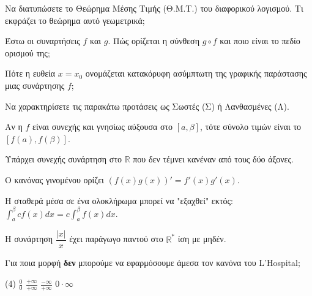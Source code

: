 \documentclass[11pt,a4paper]{article}
\newcommand{\kerkissans}[1]{{\fontfamily{maksf}\selectfont \textbf{#1}}}
\renewcommand{\textdexiakeraia}{}
\newcommand{\dint}{\displaystyle\int}
\newcommand\themanum{A}
\newcounter{thema}[section]
\renewcommand{\thethema}{\arabic{thema}}
\newcommand{\Thema}{\refstepcounter{thema}{\textbf{\textcolor{black}{\faPenSquare\ \  \large \kerkissans{\textbf{\thethemaο\hspace{2mm}Διαγώνισμα - Θέμα \themanum}}}}}\hspace{0mm}}{}
\newenvironment{thema}[1]
{\begin{tcolorbox}[title=\Thema\kerkissans{\textbf{\large{  #1}}},breakable,
enhanced standard,titlerule=0pt,toprule=0pt, rightrule=0pt, bottomrule=0pt,
colback=white,left=0mm,top=1mm,bottom=0mm,
boxrule=0pt,
colframe=white,leftrule=0mm,sharp corners,coltitle=black]
\renewcommand{\themanum}{#1}}
{\end{tcolorbox}}
\begin{document}
\begin{thema}{A}
\begin{erwthma}
    \item Να διατυπώσετε το Θεώρημα Μέσης Τιμής (Θ.Μ.Τ.) του διαφορικού λογισμού. Τι εκφράζει το θεώρημα αυτό γεωμετρικά;
    \item Έστω οι συναρτήσεις $f$ και $g$. Πώς ορίζεται η σύνθεση $g \circ f$ και ποιο είναι το πεδίο ορισμού της;
    \item Πότε η ευθεία $x=x_0$ ονομάζεται κατακόρυφη ασύμπτωτη της γραφικής παράστασης μιας συνάρτησης $f$;
    \item Να χαρακτηρίσετε τις παρακάτω προτάσεις ως Σωστές (Σ) ή Λανθασμένες (Λ).
    \begin{alist}
        \item Αν η $f$ είναι συνεχής και γνησίως αύξουσα στο $[a, \beta]$, τότε σύνολο τιμών είναι το $[f(a), f(\beta)]$.
        \item Υπάρχει συνεχής συνάρτηση στο $\mathbb{R}$ που δεν τέμνει κανέναν από τους δύο άξονες.
        \item O κανόνας γινομένου ορίζει $(f(x)g(x))' = f'(x)g'(x)$.
        \item Η σταθερά μέσα σε ένα ολοκλήρωμα μπορεί να "εξαχθεί" εκτός: $\dint_a^\beta c f(x) dx = c \dint_a^\beta f(x) dx$.
        \item Η συνάρτηση $\dfrac{|x|}{x}$ έχει παράγωγο παντού στο $\mathbb{R}^*$ ίση με μηδέν.
    \end{alist}
    \item Για ποια μορφή \textbf{δεν} μπορούμε να εφαρμόσουμε άμεσα τον κανόνα του L'Hospital;
    \begin{tasks}[label=\let\textdexiakeraia\relax\alph*.](4)
        \task $\frac{0}{0}$
        \task $\frac{+\infty}{+\infty}$
        \task $\frac{-\infty}{+\infty}$
        \task $0 \cdot \infty$
    \end{tasks}
\end{erwthma}
\end{thema}
\vspace{1cm}
\end{document}
